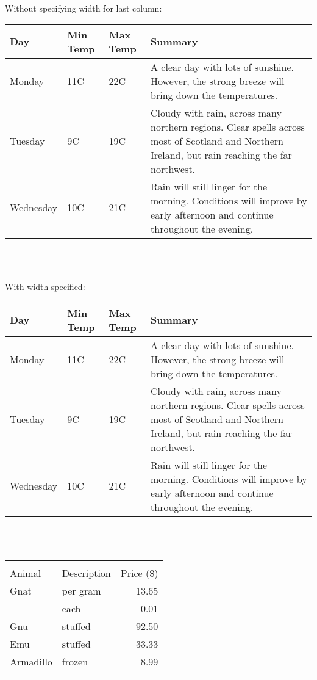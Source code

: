 \documentclass[12pt,a4paper]{article}
\begin{document}
  ~\\~
  
  Without specifying width for last column:
  \begin{center}
      \begin{tabular}{| l | l | l | l |}
      \hline
      Day & Min Temp & Max Temp & Summary \\ \hline
      Monday & 11C & 22C & A clear day with lots of sunshine.
      However, the strong breeze will bring down the temperatures. \\ \hline
      Tuesday & 9C & 19C & Cloudy with rain, across many northern regions. Clear spells 
      across most of Scotland and Northern Ireland, 
      but rain reaching the far northwest. \\ \hline
      Wednesday & 10C & 21C & Rain will still linger for the morning. 
      Conditions will improve by early afternoon and continue 
      throughout the evening. \\
      \hline
      \end{tabular}
  \end{center}

  ~\\~

  With width specified:
  \begin{center}
      \begin{tabular}{ | l | l | l | p{5cm} |}
      \hline
      Day & Min Temp & Max Temp & Summary \\ \hline
      Monday & 11C & 22C & A clear day with lots of sunshine.  
      However, the strong breeze will bring down the temperatures. \\ \hline
      Tuesday & 9C & 19C & Cloudy with rain, across many northern regions. Clear spells 
      across most of Scotland and Northern Ireland, 
      but rain reaching the far northwest. \\ \hline
      Wednesday & 10C & 21C & Rain will still linger for the morning. 
      Conditions will improve by early afternoon and continue 
      throughout the evening. \\
      \hline
      \end{tabular}
  \end{center}
  
  ~\\~
  
  \begin{tabular}{ | l | l | r | }
    \hline\noalign{\smallskip}
    \multicolumn{2}{c}{Item} \\
    \cline{1-2}\noalign{\smallskip}
    Animal & Description & Price (\$) \\
    \noalign{\smallskip}\hline\noalign{\smallskip}
    Gnat  & per gram & 13.65 \\
          & each     &  0.01 \\
    Gnu   & stuffed  & 92.50 \\
    Emu   & stuffed  & 33.33 \\
    Armadillo & frozen & 8.99 \\
    \noalign{\smallskip}\hline
  \end{tabular}
  
\end{document}
